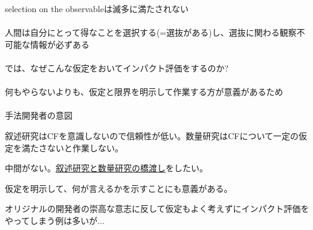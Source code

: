 \begin{frame}{}
selection on the observableは滅多に満たされない\\~\\
\pause
人間は自分にとって得なことを選択する(=選抜がある)し、選抜に関わる観察不可能な情報が必ずある\\~\\
\pause
では、なぜこんな仮定をおいてインパクト評価をするのか?\\~\\
\pause
何もやらないよりも、仮定と限界を明示して作業する方が意義があるため\\~\\
\pause
手法開発者の意図
\begin{dinglist}{43}
\vspace{1.0ex}\setlength{\itemsep}{1.0ex}\setlength{\baselineskip}{12pt}
\pause
\item	叙述研究はCFを意識しないので信頼性が低い。数量研究はCFについて一定の仮定を満たさないと作業しない。
\pause
\item	中間がない。\underline{叙述研究と数量研究の橋渡し}をしたい。
\pause
\item	仮定を明示して、何が言えるかを示すことにも意義がある。
\end{dinglist}
\vspace{2ex}
\pause
オリジナルの開発者の崇高な意志に反して仮定もよく考えずにインパクト評価をやってしまう例は多いが...
\end{frame}

